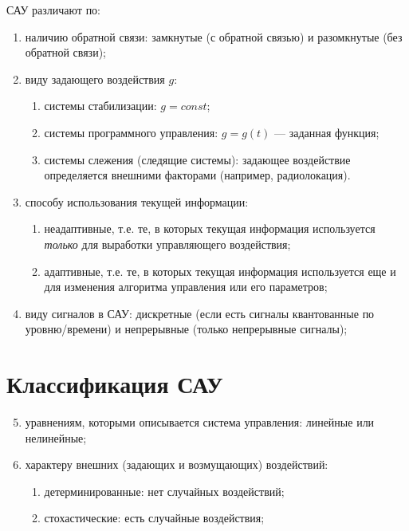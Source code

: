 \documentclass[../TAU.tex]{subfiles}
\theoremstyle{plain}
\theoremstyle{definition}
\theoremstyle{remark}
\theoremstyle{plain}
\begin{document}
САУ различают по:
\begin{enumerate}
\item наличию обратной связи: замкнутые (с обратной связью) и разомкнутые (без обратной связи);
\item виду задающего воздействия $g$:
\begin{enumerate}
\item системы стабилизации: $g=const$;
\item системы программного управления: $g=g(t)$ --- заданная функция;
\item системы слежения (следящие системы): задающее воздействие определяется внешними факторами (например, радиолокация).
\end{enumerate}
\item способу использования текущей информации:
\begin{enumerate}
\item неадаптивные, т.е.  те, в которых текущая информация используется {\it только} для выработки управляющего воздействия;
\item адаптивные, т.е. те, в которых текущая информация используется еще и для изменения алгоритма управления или его параметров;
\end{enumerate}
\item виду сигналов в САУ: дискретные (если есть сигналы квантованные по уровню/времени) и непрерывные (только непрерывные сигналы);
\end{enumerate}




\section{Классификация САУ}
\begin{enumerate}
\setcounter{enumi}{4}
\item уравнениям, которыми описывается  система управления: линейные или нелинейные;
\item характеру внешних (задающих и возмущающих) воздействий:
\begin{enumerate}
  \item детерминированные: нет случайных воздействий;
  \item стохастические: есть случайные воздействия;
\end{enumerate}

\end{enumerate}



\end{document}
